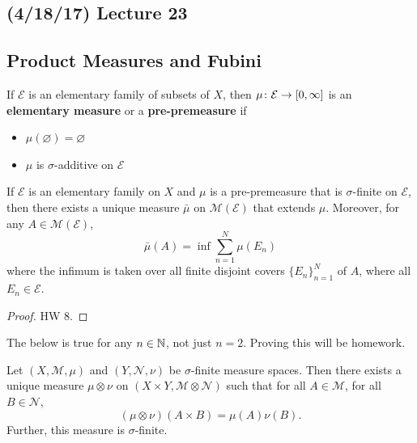\documentclass[11pt,leqno,oneside]{amsbook}
\numberwithin{thm}{section}
\newcommand{\M}{\mathcal{M}} %
\newcommand{\E}{\mathcal{E}}
\newcommand{\cN}{\mathcal{N}}
\newcommand{\s}{$\sigma$-} %
\newcommand{\x}{\times}
\newcommand{\ox}{\otimes}
\renewcommand{\emptyset}{\varnothing}
\renewcommand{\de}{\textbf} %
\begin{document}
\subsection*{(4/18/17) Lecture 23}
\subsection{Product Measures and Fubini}
\begin{defn}
  If $\E$ is an elementary family of subsets of $X$, then $\mu \from \E \to [0, \oo]$ is an \de{elementary measure} or a \de{pre-premeasure} if
  \begin{itemize}
    \item $\mu(\emptyset) = \emptyset$
    \item $\mu$ is \s additive on $\E$
  \end{itemize}
\end{defn}
\begin{thm}
  If $\E$ is an elementary family on $X$ and $\mu$ is a pre-premeasure that is \s finite on $\E$, then there exists a unique measure $\bar\mu$ on $\M(\E)$ that extends $\mu$.  Moreover, for any $A \in \M(\E)$, $$\bar\mu(A) = \inf\sum_{n=1}^N \mu(E_n)$$ where the infimum is taken over all finite disjoint covers $\{E_n\}_{n=1}^N$ of $A$, where all $E_n \in \E$.
\end{thm}
\begin{proof}
  HW 8.
\end{proof}
\begin{thm}
  The below is true for any $n \in {\mathbb N}$, not just $n = 2$.  Proving this will be homework.
\end{thm}
\begin{thm}
  Let $(X, \M, \mu)$ and $(Y, \cN, \nu)$ be \s finite measure spaces.
  Then there exists a unique measure $\mu \ox \nu$ on $(X \x Y, \M \ox
  \cN)$ such that for all $A \in \M$, for all $B \in \cN$, $$(\mu \ox \nu)(A \x B) = \mu(A)\nu(B).$$  Further, this measure is \s finite.
\end{thm}
\end{document}
